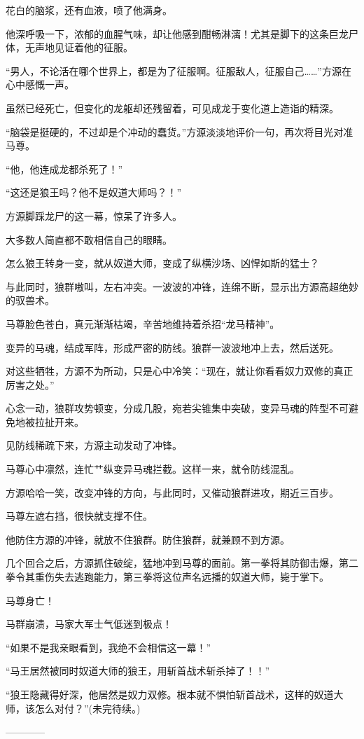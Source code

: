 \begin{this_body}
花白的脑浆，还有血液，喷了他满身。

他深呼吸一下，浓郁的血腥气味，却让他感到酣畅淋漓！尤其是脚下的这条巨龙尸体，无声地见证着他的征服。

“男人，不论活在哪个世界上，都是为了征服啊。征服敌人，征服自己……”方源在心中感慨一声。

虽然已经死亡，但变化的龙躯却还残留着，可见成龙于变化道上造诣的精深。

“脑袋是挺硬的，不过却是个冲动的蠢货。”方源淡淡地评价一句，再次将目光对准马尊。

“他，他连成龙都杀死了！”

“这还是狼王吗？他不是奴道大师吗？！”

方源脚踩龙尸的这一幕，惊呆了许多人。

大多数人简直都不敢相信自己的眼睛。

怎么狼王转身一变，就从奴道大师，变成了纵横沙场、凶悍如斯的猛士？

与此同时，狼群嗷叫，左右冲突。一波波的冲锋，连绵不断，显示出方源高超绝妙的驭兽术。

马尊脸色苍白，真元渐渐枯竭，辛苦地维持着杀招“龙马精神”。

变异的马魂，结成军阵，形成严密的防线。狼群一波波地冲上去，然后送死。

对这些牺牲，方源不为所动，只是心中冷笑：“现在，就让你看看奴力双修的真正厉害之处。”

心念一动，狼群攻势顿变，分成几股，宛若尖锥集中突破，变异马魂的阵型不可避免地被拉扯开来。

见防线稀疏下来，方源主动发动了冲锋。

马尊心中凛然，连忙艹纵变异马魂拦截。这样一来，就令防线混乱。

方源哈哈一笑，改变冲锋的方向，与此同时，又催动狼群进攻，期近三百步。

马尊左遮右挡，很快就支撑不住。

他防住方源的冲锋，就放不住狼群。防住狼群，就兼顾不到方源。

几个回合之后，方源抓住破绽，猛地冲到马尊的面前。第一拳将其防御击爆，第二拳令其重伤失去逃跑能力，第三拳将这位声名远播的奴道大师，毙于掌下。

马尊身亡！

马群崩溃，马家大军士气低迷到极点！

“如果不是我亲眼看到，我绝不会相信这一幕！”

“马王居然被同时奴道大师的狼王，用斩首战术斩杀掉了！！”

“狼王隐藏得好深，他居然是奴力双修。根本就不惧怕斩首战术，这样的奴道大师，该怎么对付？”(未完待续。)

------------

\end{this_body}

